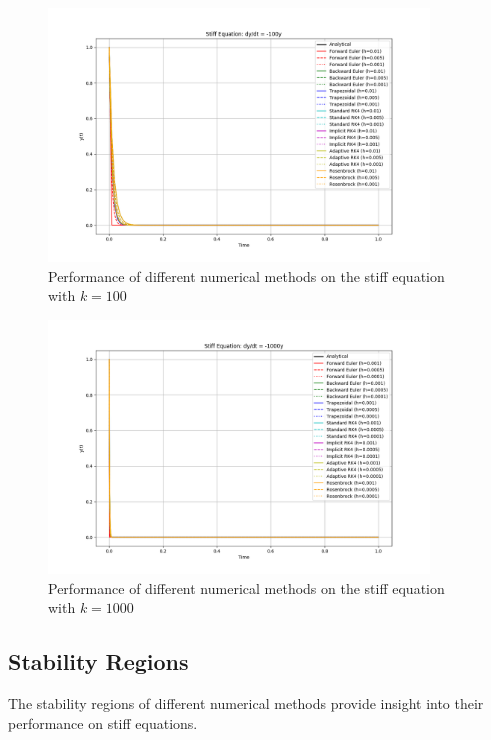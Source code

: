 \documentclass[11pt,a4paper]{article}
\begin{document}
\begin{figure}[H]
    \centering
    \includegraphics[width=0.9\textwidth]{stiff_equation_k100.png}
    \caption{Performance of different numerical methods on the stiff equation with $k=100$}
    \label{fig:k100}
\end{figure}

\begin{figure}[H]
    \centering
    \includegraphics[width=0.9\textwidth]{stiff_equation_k1000.png}
    \caption{Performance of different numerical methods on the stiff equation with $k=1000$}
    \label{fig:k1000}
\end{figure}

\subsection{Stability Regions}

The stability regions of different numerical methods provide insight into their performance on stiff equations.
\end{document}
